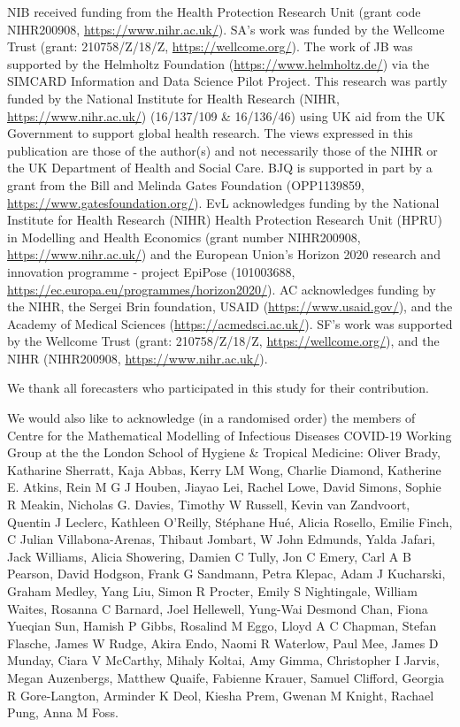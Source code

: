 \documentclass[
]{article}
\begin{document}
NIB received funding from the Health Protection Research Unit (grant code NIHR200908, \url{https://www.nihr.ac.uk/}). SA's work was funded by the Wellcome Trust (grant: 210758/Z/18/Z, \url{https://wellcome.org/}). The work of JB was supported by the Helmholtz Foundation (\url{https://www.helmholtz.de/}) via the SIMCARD Information and Data Science Pilot Project. This research was partly funded by the National Institute for Health Research (NIHR, \url{https://www.nihr.ac.uk/}) (16/137/109 \& 16/136/46) using UK aid from the UK Government to support global health research. The views expressed in this publication are those of the author(s) and not necessarily those of the NIHR or the UK Department of Health and Social Care. BJQ is supported in part by a grant from the Bill and Melinda Gates Foundation (OPP1139859, \url{https://www.gatesfoundation.org/}). EvL acknowledges funding by the National Institute for Health Research (NIHR) Health Protection Research Unit (HPRU) in Modelling and Health Economics (grant number NIHR200908, \url{https://www.nihr.ac.uk/}) and the European Union's Horizon 2020 research and innovation programme - project EpiPose (101003688, \url{https://ec.europa.eu/programmes/horizon2020/}). AC acknowledges funding by the NIHR, the Sergei Brin foundation, USAID (\url{https://www.usaid.gov/}), and the Academy of Medical Sciences (\url{https://acmedsci.ac.uk/}). SF's work was supported by the Wellcome Trust (grant: 210758/Z/18/Z, \url{https://wellcome.org/}), and the NIHR (NIHR200908, \url{https://www.nihr.ac.uk/}).

We thank all forecasters who participated in this study for their contribution.

We would also like to acknowledge (in a randomised order) the members of Centre for the Mathematical Modelling of Infectious Diseases COVID-19 Working Group at the the London School of Hygiene \& Tropical Medicine: Oliver Brady, Katharine Sherratt, Kaja Abbas, Kerry LM Wong, Charlie Diamond, Katherine E. Atkins, Rein M G J Houben, Jiayao Lei, Rachel Lowe, David Simons, Sophie R Meakin, Nicholas G. Davies, Timothy W Russell, Kevin van Zandvoort, Quentin J Leclerc, Kathleen O'Reilly, Stéphane Hué, Alicia Rosello, Emilie Finch, C Julian Villabona-Arenas, Thibaut Jombart, W John Edmunds, Yalda Jafari, Jack Williams, Alicia Showering, Damien C Tully, Jon C Emery, Carl A B Pearson, David Hodgson, Frank G Sandmann, Petra Klepac, Adam J Kucharski, Graham Medley, Yang Liu, Simon R Procter, Emily S Nightingale, William Waites, Rosanna C Barnard, Joel Hellewell, Yung-Wai Desmond Chan, Fiona Yueqian Sun, Hamish P Gibbs, Rosalind M Eggo, Lloyd A C Chapman, Stefan Flasche, James W Rudge, Akira Endo, Naomi R Waterlow, Paul Mee, James D Munday, Ciara V McCarthy, Mihaly Koltai, Amy Gimma, Christopher I Jarvis, Megan Auzenbergs, Matthew Quaife, Fabienne Krauer, Samuel Clifford, Georgia R Gore-Langton, Arminder K Deol, Kiesha Prem, Gwenan M Knight, Rachael Pung, Anna M Foss.
\end{document}
